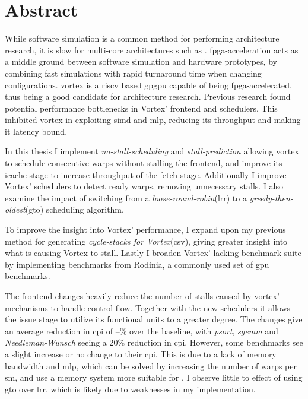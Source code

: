 \chapter*{Abstract}

While software simulation is a common method for performing architecture research, it is slow for multi-core architectures such as . \acrshort{fpga}-acceleration acts as a middle ground between software simulation and hardware prototypes, by combining fast simulations with rapid turnaround time when changing configurations. \Gls{vortex} is a \Gls{riscv} based \acrshort{gpgpu} capable of being \acrshort{fpga}-accelerated, thus being a good candidate for architecture research. Previous research found potential performance bottlenecks in Vortex' frontend and schedulers. This inhibited vortex in exploiting \acrshort{simd} and \acrshort{mlp}, reducing its throughput and making it latency bound.

In this thesis I implement \textit{no-stall-scheduling} and \textit{stall-prediction} allowing vortex to schedule consecutive warps without stalling the frontend, and improve its icache-stage to increase throughput of the fetch stage. Additionally I improve Vortex' schedulers to detect ready warps, removing unnecessary stalls. I also examine the impact of switching from a \textit{loose-round-robin}(\acrshort{lrr}) to a \textit{greedy-then-oldest}(\acrshort{gto}) scheduling algorithm.

To improve the insight into Vortex' performance, I expand upon my previous method for generating \textit{cycle-stacks for Vortex}(\acrshort{csv}), giving greater insight into what is causing Vortex to stall. Lastly I broaden Vortex' lacking benchmark suite by implementing benchmarks from Rodinia, a commonly used set of \acrshort{gpu} benchmarks. 

The frontend changes heavily reduce the number of stalls caused by \Gls{vortex}' mechanisms to handle control flow. Together with the new schedulers it allows the issue stage to utilize its functional units to a greater degree. The changes give an average reduction in \acrshort{cpi} of --\% over the baseline, with \textit{psort}, \textit{sgemm} and \textit{Needleman-Wunsch} seeing a 20\% reduction in \acrshort{cpi}. However, some benchmarks see a slight increase or no change to their \acrshort{cpi}. This is due to a lack of memory bandwidth and \acrshort{mlp}, which can be solved by increasing the number of warps per \acrshort{sm}, and use a memory system more suitable for . I observe little to effect of using \acrshort{gto} over \acrshort{lrr}, which is likely due to weaknesses in my implementation. 